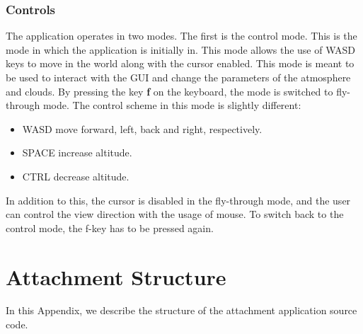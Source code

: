 \documentclass{ctuthesis}
\begin{document}
\subsection{Controls}
The application operates in two modes. The first is the control mode. This is the mode in which the application is initially in.
This mode allows the use of WASD keys to move in the world along with the cursor enabled. This mode is meant to be used to 
interact with the GUI and change the parameters of the atmosphere and clouds. By pressing the key \textbf{f} on the keyboard, the mode is switched to fly-through mode. The control scheme in this mode is slightly different:
\begin{itemize}
    \item WASD  move forward, left, back and right, respectively.
    \item SPACE  increase altitude.
    \item CTRL  decrease altitude.
\end{itemize}
In addition to this, the cursor is disabled in the fly-through mode, and the user can control the view direction with the usage of mouse. 
To switch back to the control mode, the f-key has to be pressed again.

\appendix
\chapter{Attachment Structure }
In this Appendix, we describe the structure of the attachment application source code. 
\end{document}

